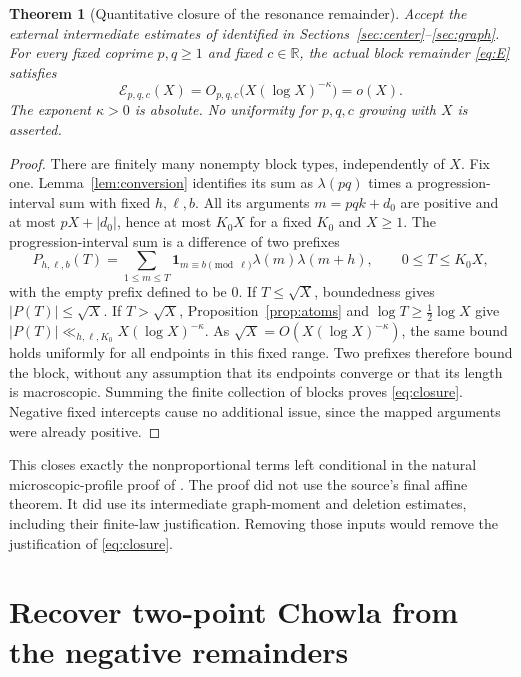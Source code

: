 \documentclass[11pt,a4paper]{article}
\numberwithin{equation}{section}
\newtheorem{theorem}{Theorem}[section]
\theoremstyle{remark}\newtheorem{remark}[theorem]{Remark}
\newcommand{\R}{\mathbb R}
\newcommand{\1}{\mathbf 1}
\begin{document}
\begin{theorem}[Quantitative closure of the resonance remainder]
\label{thm:closure}
Accept the external intermediate estimates of \cite{final} identified
in Sections~\ref{sec:center}--\ref{sec:graph}. For every fixed coprime
$p,q\ge1$ and fixed $c\in\R$, the actual block remainder
\eqref{eq:E} satisfies
\begin{equation}\label{eq:closure}
 \boxed{\ \mathcal E_{p,q,c}(X)
       =O_{p,q,c}\bigl(X(\log X)^{-\kappa}\bigr)=o(X).\ }
\end{equation}
The exponent $\kappa>0$ is absolute. No uniformity for $p,q,c$ growing
with $X$ is asserted.
\end{theorem}
\begin{proof}
There are finitely many nonempty block types, independently of $X$.
Fix one. Lemma~\ref{lem:conversion} identifies its sum as
$\lambda(pq)$ times a progression-interval sum with fixed $h,\ell,b$.
All its arguments $m=pqk+d_0$ are positive and at most
$pX+|d_0|$, hence at most $K_0X$ for a fixed $K_0$ and $X\ge1$.
The progression-interval sum is a difference of two prefixes
\[
 P_{h,\ell,b}(T)=\sum_{1\le m\le T}
 \1_{m\equiv b\pmod\ell}\lambda(m)\lambda(m+h),
 \qquad 0\le T\le K_0X,
\]
with the empty prefix defined to be $0$. If $T\le\sqrt X$, boundedness
gives $|P(T)|\le\sqrt X$. If $T>\sqrt X$, Proposition~\ref{prop:atoms}
and $\log T\ge\tfrac12\log X$ give
$|P(T)|\ll_{h,\ell,K_0}X(\log X)^{-\kappa}$.
As $\sqrt X=O(X(\log X)^{-\kappa})$, the same bound holds uniformly
for all endpoints in this fixed range. Two prefixes therefore bound
the block, without any assumption that its endpoints converge or that
its length is macroscopic. Summing the finite collection of blocks
proves \eqref{eq:closure}. Negative fixed intercepts cause no additional
issue, since the mapped arguments were already positive.
\end{proof}

This closes exactly the nonproportional terms left conditional in the
natural microscopic-profile proof of \cite[Section 5]{resonance}.
The proof did not use the source's final affine theorem. It did use
its intermediate graph-moment and deletion estimates, including their
finite-law justification. Removing those inputs would remove the
justification of \eqref{eq:closure}.

\section{Recover two-point Chowla from the negative remainders}
\label{sec:chowla}
\end{document}
